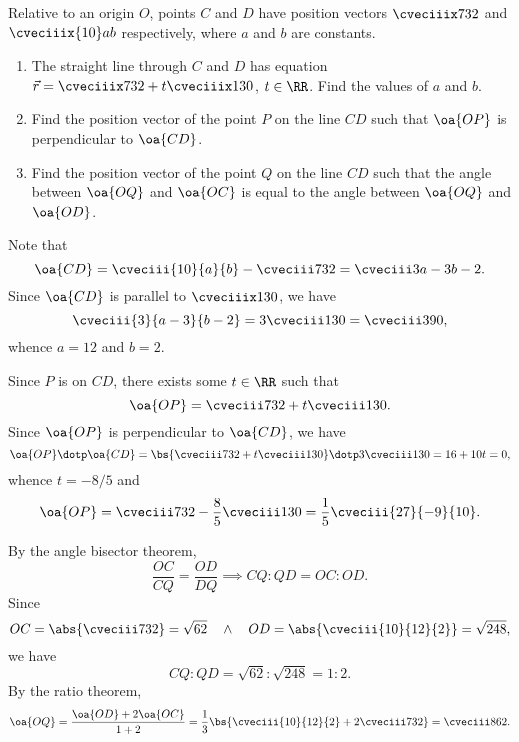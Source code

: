 \begin{problem}
    Relative to an origin $O$, points $C$ and $D$ have position vectors $\cveciiix732$ and $\cveciiix{10}ab$ respectively, where $a$ and $b$ are constants.

    \begin{enumerate}
        \item The straight line through $C$ and $D$ has equation $\vec r = \cveciiix732 + t\cveciiix130$, $t \in \RR$. Find the values of $a$ and $b$.
        \item Find the position vector of the point $P$ on the line $CD$ such that $\oa{OP}$ is perpendicular to $\oa{CD}$.
        \item Find the position vector of the point $Q$ on the line $CD$ such that the angle between $\oa{OQ}$ and $\oa{OC}$ is equal to the angle between $\oa{OQ}$ and $\oa{OD}$.
    \end{enumerate}
\end{problem}
\begin{solution}
    \begin{ppart}
        Note that \[\oa{CD} = \cveciii{10}{a}{b} - \cveciii732 = \cveciii3{a-3}{b-2}.\] Since $\oa{CD}$ is parallel to $\cveciiix130$, we have \[\cveciii{3}{a-3}{b-2} = 3\cveciii130 = \cveciii390,\] whence $a = 12$ and $b = 2$.
    \end{ppart}
    \begin{ppart}
        Since $P$ is on $CD$, there exists some $t \in \RR$ such that \[\oa{OP} = \cveciii732 + t \cveciii130.\] Since $\oa{OP}$ is perpendicular to $\oa{CD}$, we have \[\oa{OP} \dotp \oa{CD} = \bs{\cveciii732 + t\cveciii130} \dotp 3\cveciii130 = 16 + 10t = 0,\] whence $t = -8/5$ and \[\oa{OP} = \cveciii732 - \frac85 \cveciii130 = \frac15 \cveciii{27}{-9}{10}.\]
    \end{ppart}
    \begin{ppart}
        By the angle bisector theorem, \[\frac{OC}{CQ} = \frac{OD}{DQ} \implies CQ:QD = OC : OD.\] Since \[OC = \abs{\cveciii732} = \sqrt{62} \quad \land \quad OD = \abs{\cveciii{10}{12}{2}} = \sqrt{248},\] we have \[CQ : QD = \sqrt{62} : \sqrt{248} = 1 : 2.\] By the ratio theorem, \[\oa{OQ} = \frac{\oa{OD} + 2 \oa{OC}}{1 + 2} = \frac13 \bs{\cveciii{10}{12}{2} + 2\cveciii732} = \cveciii862.\]
    \end{ppart}
\end{solution}

